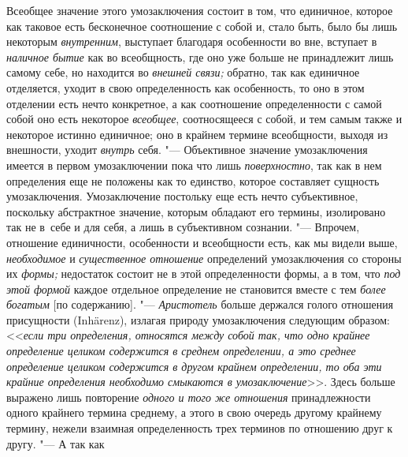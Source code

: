 Всеобщее значение этого умозаключения состоит в том, что
единичное, которое как таковое есть бесконечное соотношение с собой и,
стало быть, было бы лишь некоторым
{\em внутренним},
выступает благодаря особенности во вне, вступает в
{\em наличное бытие} как
во всеобщность, где оно уже больше не принадлежит лишь самому себе, но
находится во {\em внешней связи;}
обратно, так как единичное отделяется, уходит в свою
определенность как особенность, то оно в этом отделении есть
нечто конкретное, а как соотношение определенности с самой собой оно есть
некоторое {\em всеобщее},
соотносящееся с собой, и тем самым также и некоторое истинно
единичное; оно в крайнем термине всеобщности, выходя из внешности, уходит
{\em внутрь} себя. "---
Объективное значение умозаключения имеется в первом
умозаключении пока что лишь
{\em поверхностно}, так
как в нем определения еще не положены как то единство, которое составляет
сущность умозаключения. Умозаключение постольку еще есть нечто
субъективное, поскольку абстрактное значение, которым обладают его термины,
изолировано так не в~себе и для себя, а лишь в субъективном сознании. "---
Впрочем, отношение единичности, особенности и всеобщности
есть, как мы видели выше,
{\em необходимое} и
{\em существенное отношение}
определений умозаключения со стороны их
{\em формы;} недостаток
состоит не в этой определенности формы, а в том, что
{\em под этой формой}
каждое отдельное определение не становится вместе с тем
{\em более богатым} [по
содержанию]. "--- {\em Аристотель}
больше держался голого отношения присущности (Inhärenz),
излагая природу умозаключения следующим образом:
<<{\em если три определения, относятся
между собой так, что одно крайнее определение целиком содержится в среднем
определении, а это среднее определение целиком содержится в другом крайнем
определении, то оба эти крайние определения необходимо смыкаются в
умозаключение}>>.
Здесь больше выражено лишь повторение
{\em одного и того же отношения}
принадлежности одного крайнего термина среднему, а этого в
свою очередь другому крайнему термину, нежели взаимная определенность трех
терминов по отношению друг к другу. "--- А так как
